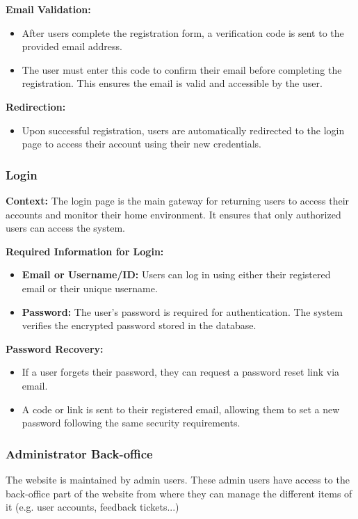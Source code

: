 \documentclass[conference]{IEEEtran}
\begin{document}
\textbf{Email Validation:}
\begin{itemize}
    \item After users complete the registration form, a verification code is sent to the provided email address.
    \item The user must enter this code to confirm their email before completing the registration. This ensures the email is valid and accessible by the user.
\end{itemize}

\textbf{Redirection:}
\begin{itemize}
    \item Upon successful registration, users are automatically redirected to the login page to access their account using their new credentials.
\end{itemize}

\subsubsection{Login}
\textbf{Context:} The login page is the main gateway for returning users to access their accounts and monitor their home environment. It ensures that only authorized users can access the system.

\textbf{Required Information for Login:}
\begin{itemize}
    \item \textbf{Email or Username/ID:} Users can log in using either their registered email or their unique username.
    \item \textbf{Password:} The user’s password is required for authentication. The system verifies the encrypted password stored in the database.
\end{itemize}

\textbf{Password Recovery:}
\begin{itemize}
    \item If a user forgets their password, they can request a password reset link via email.
    \item A code or link is sent to their registered email, allowing them to set a new password following the same security requirements.
\end{itemize}

\subsubsection{Administrator Back-office}
The website is maintained by admin users. These admin users have access to the back-office part of the website from where they can manage the different items of it (e.g. user accounts, feedback tickets...)
\end{document}
